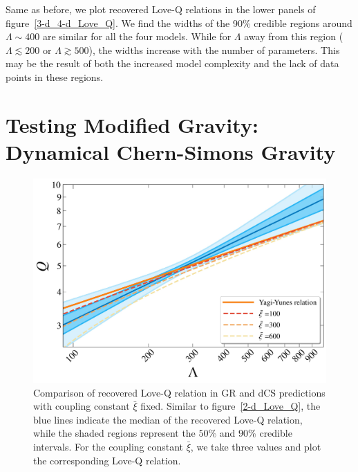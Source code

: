 \documentclass[a4paper,11pt]{article}
\begin{document}
Same as before, we plot recovered Love-Q relations in the lower panels of 
figure~\ref{3-d_4-d_Love_Q}. We find the widths of the 90\% credible regions 
around $\Lambda \sim 400$ are similar for all the four models. While for
$\Lambda$ away from this region ($\Lambda \lesssim 200$ or $\Lambda \gtrsim 500$), 
the widths increase with the number of parameters. This may be the result of both 
the increased model complexity and the lack of data points in these
regions. 

\section{Testing Modified Gravity: Dynamical Chern-Simons Gravity}
\label{sec:dCS}

\begin{figure}[t]
    \centering
    \begin{minipage}{0.6\linewidth}
        \includegraphics[width=\linewidth]{fig_CS_xi_bar_APR4_2d.pdf}
    \end{minipage}
    \caption{Comparison of recovered Love-Q relation in GR
    and dCS predictions 
    with coupling constant $\bar{\xi}$ fixed. Similar to figure~\ref{2-d_Love_Q}, the
    blue lines indicate the median of the recovered Love-Q relation, while the
    shaded regions represent the $50\%$ and $90\%$ credible intervals. For the coupling constant 
    $\bar\xi$, we take three values
    and plot the corresponding Love-Q relation.}
    \label{cs_Love_Q}
\end{figure}
\end{document}
